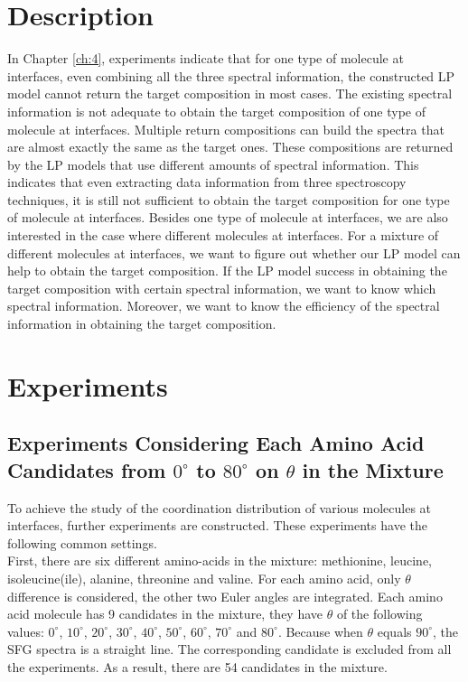  \label{ch:5}
\section{Description}

In Chapter \ref{ch:4}, experiments indicate that for one type of molecule at interfaces, even combining all the three spectral information, the constructed LP model cannot return the target composition in most cases. The existing spectral information is not adequate to obtain the target composition of one type of molecule at interfaces. Multiple return compositions can build the spectra that are almost exactly the same as the target ones. These compositions are returned by the LP models that use different amounts of spectral information. This indicates that even extracting data information from three spectroscopy techniques, it is still not sufficient to obtain the target composition for one type of molecule at interfaces. Besides one type of molecule at interfaces, we are also interested in the case where different molecules at interfaces. For a mixture of different molecules at interfaces, we want to figure out whether our LP model can help to obtain the target composition. If the LP model success in obtaining the target composition with certain spectral information, we want to know which spectral information. Moreover, we want to know the efficiency of the spectral information in obtaining the target composition. \\

\section{Experiments}
\subsection{Experiments Considering Each Amino Acid Candidates from $0^{\circ}$ to $80^{\circ}$ on $\theta$ in the Mixture}
To achieve the study of the coordination distribution of various molecules at interfaces, further experiments are constructed. These experiments have the following common settings. \\

First, there are six different amino-acids in the mixture: methionine, leucine, isoleucine(ile), alanine, threonine and valine. For each amino acid, only $\theta$ difference is considered, the other two Euler angles are integrated. Each amino acid molecule has 9 candidates in the mixture, they have $\theta$ of the following values: $0^{\circ}$,  $10^{\circ}$, $20^{\circ}$, $30^{\circ}$, $40^{\circ}$, $50^{\circ}$, $60^{\circ}$, $70^{\circ}$ and $80^{\circ}$. Because when $\theta$ equals $90^{\circ}$, the SFG spectra is a straight line. The corresponding candidate is excluded from all the experiments. As a result, there are 54 candidates in the mixture. \\


